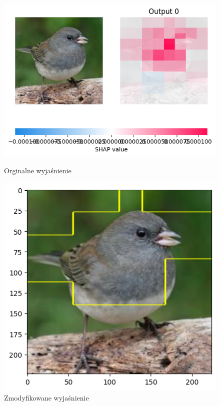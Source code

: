 \begin{figure}
	\centering
	\begin{minipage}[b]{0.3\textwidth}
		\includegraphics[width=.9\textwidth]{img/parameters/shap/threshold_base}
		\caption{Orginalne wyjaśnienie}  \label{rys:parameters_lime_numsamples_5}
	\end{minipage}
	\begin{minipage}[b]{0.3\textwidth}
		\centering\includegraphics[width=.9\textwidth]{img/parameters/shap/threshold_mean}
		\caption{Zmodyfikowane wyjaśnienie}  \label{rys:parameters_lime_numsamples_1000}
	\end{minipage}
\end{figure}

